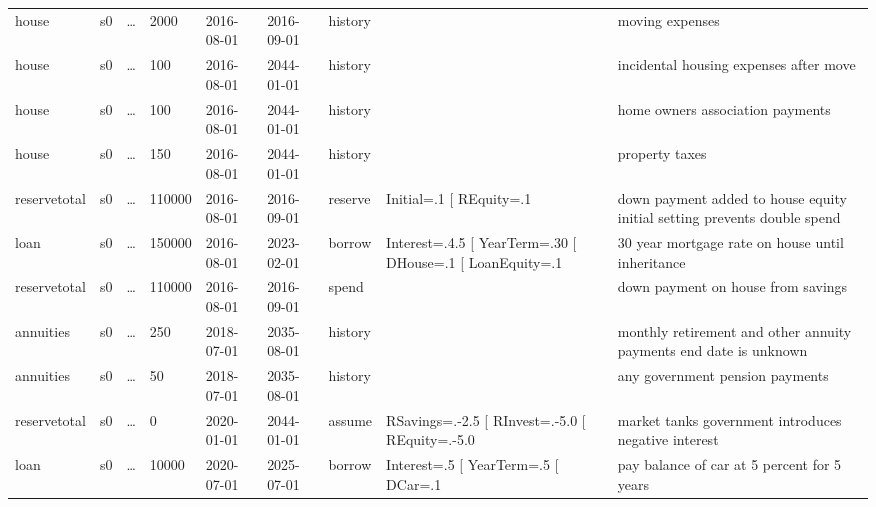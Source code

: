 \begin{sidewaystable}
\begin{tabular}{llllllllp{1.5in}}
house        &s0 &\ldots &2000   &2016-08-01 &2016-09-01 &history  &                                                               &moving expenses  \\                                                               
house        &s0 &\ldots &100    &2016-08-01 &2044-01-01 &history  &                                                               &incidental housing expenses after move  \\                                        
house        &s0 &\ldots &100    &2016-08-01 &2044-01-01 &history  &                                                               &home owners association payments \\                                               
house        &s0 &\ldots &150    &2016-08-01 &2044-01-01 &history  &                                                               &property taxes \\                                                                 
reservetotal &s0 &\ldots &110000 &2016-08-01 &2016-09-01 &reserve  &Initial=.1 [ REquity=.1                                       &down payment added to house equity initial setting prevents double spend  \\      
loan         &s0 &\ldots &150000 &2016-08-01 &2023-02-01 &borrow   &Interest=.4.5 [ YearTerm=.30 [ DHouse=.1 [ LoanEquity=.1    &30 year mortgage rate on house until inheritance \\                               
reservetotal &s0 &\ldots &110000 &2016-08-01 &2016-09-01 &spend    &                                                               &down payment on house from savings \\                                             
annuities    &s0 &\ldots &250    &2018-07-01 &2035-08-01 &history  &                                                               &monthly retirement and other annuity payments end date is unknown \\              
annuities    &s0 &\ldots &50     &2018-07-01 &2035-08-01 &history  &                                                               &any government pension payments \\                                                
reservetotal &s0 &\ldots &0      &2020-01-01 &2044-01-01 &assume   &RSavings=.-2.5 [ RInvest=.-5.0 [ REquity=.-5.0 &market tanks government introduces negative interest \\                           
loan         &s0 &\ldots &10000  &2020-07-01 &2025-07-01 &borrow   &Interest=.5 [ YearTerm=.5 [ DCar=.1                          &pay balance of car at 5 percent for 5 years  \\                                          

\end{tabular}
\end{sidewaystable}

